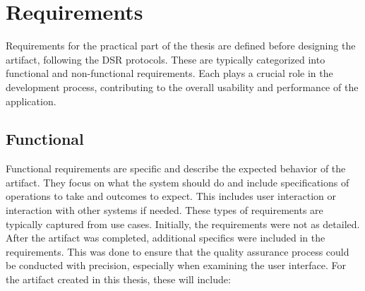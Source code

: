 \newpage

\section{Requirements} 
\label{Requirements}

Requirements for the practical part of the thesis are defined before designing the artifact, following the DSR protocols. These are typically categorized into functional and non-functional requirements. Each plays a crucial role in the development process, contributing to the overall usability and performance of the application.

\subsection{Functional}

Functional requirements are specific and describe the expected behavior of the artifact. They focus on what the system should do and include specifications of operations to take and outcomes to expect. This includes user interaction or interaction with other systems if needed. These types of requirements are typically captured from use cases. Initially, the requirements were not as detailed. After the artifact was completed, additional specifics were included in the requirements. This was done to ensure that the quality assurance process could be conducted with precision, especially when examining the user interface. For the artifact created in this thesis, these will include: 



